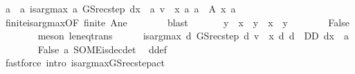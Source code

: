 \begin{isabellebody}
\ a\ \ a{\isacharcolon}{\kern0pt}\ {\isachardoublequoteopen}is{\isacharunderscore}{\kern0pt}arg{\isacharunderscore}{\kern0pt}max\ {\isacharparenleft}{\kern0pt}{\isasymlambda}a{\isachardot}{\kern0pt}\ GS{\isacharunderscore}{\kern0pt}rec{\isacharunderscore}{\kern0pt}step\ {\isacharparenleft}{\kern0pt}d{\isacharparenleft}{\kern0pt}x\ {\isacharcolon}{\kern0pt}{\isacharequal}{\kern0pt}\ a{\isacharparenright}{\kern0pt}{\isacharparenright}{\kern0pt}\ v\ {\isachardollar}{\kern0pt}\ x{\isacharparenright}{\kern0pt}\ {\isacharparenleft}{\kern0pt}{\isasymlambda}a{\isachardot}{\kern0pt}\ a\ {\isasymin}\ A\ x{\isacharparenright}{\kern0pt}\ a{\isachardoublequoteclose}\isanewline
\ \ \ \ \ \ \isamarkupfalse%
\ finite{\isacharunderscore}{\kern0pt}is{\isacharunderscore}{\kern0pt}arg{\isacharunderscore}{\kern0pt}max{\isacharbrackleft}{\kern0pt}OF\ finite\ A{\isacharunderscore}{\kern0pt}ne{\isacharbrackright}{\kern0pt}\isanewline
\ \ \ \ \ \ \isamarkupfalse%
\ blast\isanewline
\ \ \ \ \isamarkupfalse%
\ {}{\isacharcolon}{\kern0pt}\ {\isachardoublequoteopen}y\ {\isasymle}\ x\ {\isasymLongrightarrow}\ y\ {\isacharequal}{\kern0pt}\ x{\isachardoublequoteclose}\ \ y\isanewline
\ \ \ \ \ \ \isamarkupfalse%
\ False\isanewline
\ \ \ \ \ \ \isamarkupfalse%
\ {\isacharparenleft}{\kern0pt}meson\ le{\isacharunderscore}{\kern0pt}neq{\isacharunderscore}{\kern0pt}trans{\isacharparenright}{\kern0pt}\isanewline
\ \ \ \ \isamarkupfalse%
\ {\isachardoublequoteopen}is{\isacharunderscore}{\kern0pt}arg{\isacharunderscore}{\kern0pt}max\ {\isacharparenleft}{\kern0pt}{\isasymlambda}d{\isachardot}{\kern0pt}\ GS{\isacharunderscore}{\kern0pt}rec{\isacharunderscore}{\kern0pt}step\ d\ v\ {\isachardollar}{\kern0pt}\ x{\isacharparenright}{\kern0pt}\ {\isacharparenleft}{\kern0pt}{\isasymlambda}d{\isachardot}{\kern0pt}\ d\ {\isasymin}\ D\isactrlsub D{\isacharparenright}{\kern0pt}\ {\isacharparenleft}{\kern0pt}d{\isacharparenleft}{\kern0pt}x\ {\isacharcolon}{\kern0pt}{\isacharequal}{\kern0pt}\ a{\isacharparenright}{\kern0pt}{\isacharparenright}{\kern0pt}{\isachardoublequoteclose}\isanewline
\ \ \ \ \ \ \isamarkupfalse%
\ False\ a\ SOME{\isacharunderscore}{\kern0pt}is{\isacharunderscore}{\kern0pt}dec{\isacharunderscore}{\kern0pt}det\ \isamarkupfalse%
\ d{\isacharunderscore}{\kern0pt}def\isanewline
\ \ \ \ \ \ \isamarkupfalse%
\ {\isacharparenleft}{\kern0pt}fastforce\ intro{\isacharbang}{\kern0pt}{\isacharcolon}{\kern0pt}\ is{\isacharunderscore}{\kern0pt}arg{\isacharunderscore}{\kern0pt}max{\isacharunderscore}{\kern0pt}GS{\isacharunderscore}{\kern0pt}rec{\isacharunderscore}{\kern0pt}step{\isacharunderscore}{\kern0pt}act{\isacharparenright}{\kern0pt}\isanewline

\end{isabellebody}
